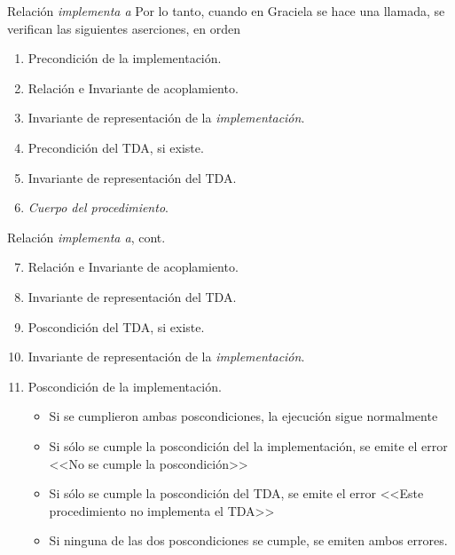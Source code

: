 \begin{frame}{Relación \textit{implementa a}}
Por lo tanto, cuando en Graciela se hace una llamada, se verifican las siguientes aserciones, en orden

\begin{enumerate}
  \item Precondición de la implementación.

  \item Relación e Invariante de acoplamiento.

  \item Invariante de representación de la \textit{implementación}.

  \item Precondición del TDA, si existe.

  \item Invariante de representación del TDA.

  \item \textit{Cuerpo del procedimiento}.


\end{enumerate}
\end{frame}

\begin{frame}{Relación \textit{implementa a}, cont.}
\begin{enumerate}\setcounter{enumi}{6}
  \item Relación e Invariante de acoplamiento.

  \item Invariante de representación del TDA.

  \item Poscondición del TDA, si existe.

  \item Invariante de representación de la \textit{implementación}.

  \item Poscondición de la implementación.
    \begin{itemize}
      \item Si se cumplieron ambas poscondiciones, la ejecución sigue normalmente
      \item Si sólo se cumple la poscondición del la implementación, se emite el
      error <<No se cumple la poscondición>>
      \item Si sólo se cumple la poscondición del TDA, se emite el error <<Este
      procedimiento no implementa el TDA>>
      \item Si ninguna de las dos poscondiciones se cumple, se emiten ambos errores.
    \end{itemize}
\end{enumerate}
\end{frame}


